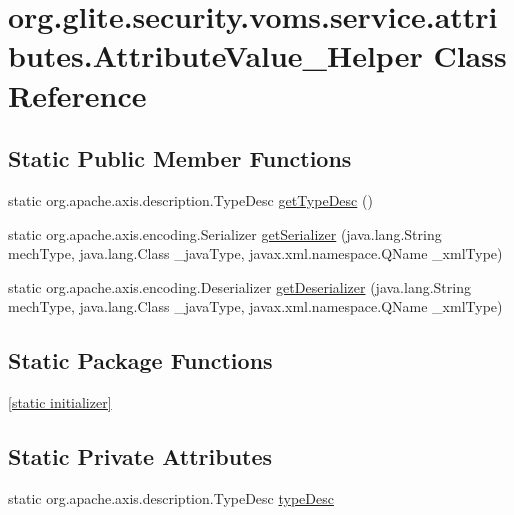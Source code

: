 \hypertarget{classorg_1_1glite_1_1security_1_1voms_1_1service_1_1attributes_1_1AttributeValue__Helper}{
\section{org.glite.security.voms.service.attributes.AttributeValue\_\-Helper Class Reference}
\label{classorg_1_1glite_1_1security_1_1voms_1_1service_1_1attributes_1_1AttributeValue__Helper}
}
\subsection*{Static Public Member Functions}
\begin{DoxyCompactItemize}
\item 
static org.apache.axis.description.TypeDesc \hyperlink{classorg_1_1glite_1_1security_1_1voms_1_1service_1_1attributes_1_1AttributeValue__Helper_a916de60420a97cb761cada694400e850}{getTypeDesc} ()
\item 
static org.apache.axis.encoding.Serializer \hyperlink{classorg_1_1glite_1_1security_1_1voms_1_1service_1_1attributes_1_1AttributeValue__Helper_ab87e7362c9c2411a099a790a908a7c6b}{getSerializer} (java.lang.String mechType, java.lang.Class \_\-javaType, javax.xml.namespace.QName \_\-xmlType)
\item 
static org.apache.axis.encoding.Deserializer \hyperlink{classorg_1_1glite_1_1security_1_1voms_1_1service_1_1attributes_1_1AttributeValue__Helper_a7ea7706d815f083db718063578f9160d}{getDeserializer} (java.lang.String mechType, java.lang.Class \_\-javaType, javax.xml.namespace.QName \_\-xmlType)
\end{DoxyCompactItemize}
\subsection*{Static Package Functions}
\begin{DoxyCompactItemize}
\item 
\hyperlink{classorg_1_1glite_1_1security_1_1voms_1_1service_1_1attributes_1_1AttributeValue__Helper_af93a04341e9201f92dd88bd94cfc9e14}{\mbox{[}static initializer\mbox{]}}
\end{DoxyCompactItemize}
\subsection*{Static Private Attributes}
\begin{DoxyCompactItemize}
\item 
static org.apache.axis.description.TypeDesc \hyperlink{classorg_1_1glite_1_1security_1_1voms_1_1service_1_1attributes_1_1AttributeValue__Helper_a03972bb93f35dd2eb4a562d9ee45fe30}{typeDesc}
\end{DoxyCompactItemize}


